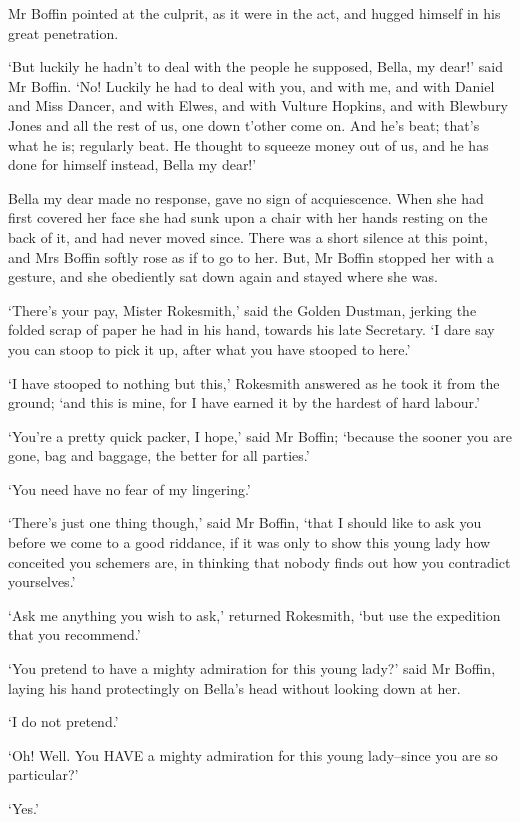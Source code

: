 Mr Boffin pointed at the culprit, as it were in the act, and hugged
himself in his great penetration.

‘But luckily he hadn’t to deal with the people he supposed, Bella, my
dear!’ said Mr Boffin. ‘No! Luckily he had to deal with you, and with
me, and with Daniel and Miss Dancer, and with Elwes, and with Vulture
Hopkins, and with Blewbury Jones and all the rest of us, one down
t’other come on. And he’s beat; that’s what he is; regularly beat. He
thought to squeeze money out of us, and he has done for himself instead,
Bella my dear!’

Bella my dear made no response, gave no sign of acquiescence. When she
had first covered her face she had sunk upon a chair with her hands
resting on the back of it, and had never moved since. There was a short
silence at this point, and Mrs Boffin softly rose as if to go to her.
But, Mr Boffin stopped her with a gesture, and she obediently sat down
again and stayed where she was.

‘There’s your pay, Mister Rokesmith,’ said the Golden Dustman,
jerking the folded scrap of paper he had in his hand, towards his late
Secretary. ‘I dare say you can stoop to pick it up, after what you have
stooped to here.’

‘I have stooped to nothing but this,’ Rokesmith answered as he took it
from the ground; ‘and this is mine, for I have earned it by the hardest
of hard labour.’

‘You’re a pretty quick packer, I hope,’ said Mr Boffin; ‘because the
sooner you are gone, bag and baggage, the better for all parties.’

‘You need have no fear of my lingering.’

‘There’s just one thing though,’ said Mr Boffin, ‘that I should like to
ask you before we come to a good riddance, if it was only to show this
young lady how conceited you schemers are, in thinking that nobody finds
out how you contradict yourselves.’

‘Ask me anything you wish to ask,’ returned Rokesmith, ‘but use the
expedition that you recommend.’

‘You pretend to have a mighty admiration for this young lady?’ said Mr
Boffin, laying his hand protectingly on Bella’s head without looking
down at her.

‘I do not pretend.’

‘Oh! Well. You HAVE a mighty admiration for this young lady--since you
are so particular?’

‘Yes.’

